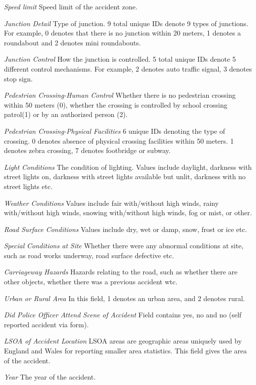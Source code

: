 \documentclass[a4paper, 12pt]{article}
\begin{document}
\begin{description}
\item{\emph{Speed limit}} Speed limit of the accident zone.
\item{\emph{Junction Detail}} Type of junction. 9 total unique IDs denote 9 types of junctions. For example, 0 denotes that there is no junction within 20 meters, 1 denotes a roundabout and 2 denotes mini roundabouts.
\item{\emph{Junction Control}} How the junction is controlled. 5 total unique IDs denote 5 different control mechanisms. For example, 2 denotes auto traffic signal, 3 denotes stop sign. 
\item{\emph{Pedestrian Crossing-Human Control}} Whether there is no pedestrian crossing within 50 meters (0), whether the crossing is controlled by school  crossing patrol(1) or by an authorized person (2).
\item{\emph{Pedestrian Crossing-Physical Facilities}} 6 unique IDs denoting the type of crossing. 0 denotes absence of physical crossing facilities within 50 meters. 1 denotes zebra crossing, 7 denotes footbridge or subway.
\item{\emph{Light Conditions}} The condition of lighting. Values include daylight, darkness with street lights on, darkness with street lights available but unlit, darkness with no street lights etc.
\item{\emph{Weather Conditions}} Values include fair with/without high winds, rainy with/without high winds, snowing with/without high winds, fog or mist, or other.
\item{\emph{Road Surface Conditions}} Values include dry, wet or damp, snow, frost or ice etc.
\item{\emph{Special Conditions at Site}} Whether there were any abnormal conditions at site, such as road works underway, road surface defective etc.
\item{\emph{Carriageway Hazards}} Hazards relating to the road, such as whether there are other objects, whether there was a previous accident wtc.
\item{\emph{Urban or Rural Area}} In this field, 1 denotes an urban area, and 2 denotes rural.
\item{\emph{Did Police Officer Attend Scene of Accident}} Field contains yes, no and no (self reported accident via form).
\item{\emph{LSOA of Accident Location}} LSOA areas are geographic areas uniquely used by England and Wales for reporting smaller area statistics. This field gives the area of the accident.
\item{\emph{Year}} The year of the accident.
\end{description}
\end{document}
